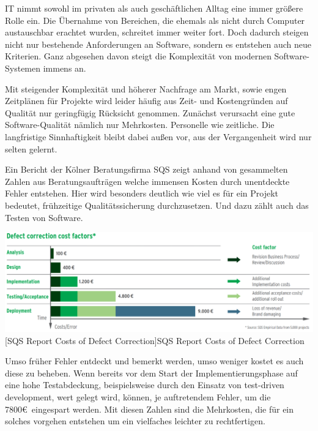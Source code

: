 \documentclass[12pt,a4paper,bibliography=totocnumbered,listof=totocnumbered]{scrartcl}
\begin{document}
IT nimmt sowohl im privaten als auch geschäftlichen Alltag eine immer größere Rolle ein. Die Übernahme von Bereichen, die ehemals als nicht durch Computer austauschbar erachtet wurden, schreitet immer weiter fort. Doch dadurch steigen nicht nur bestehende Anforderungen an Software, sondern es entstehen auch neue Kriterien. Ganz abgesehen davon steigt die Komplexität von modernen Software-Systemen immens an.

Mit steigender Komplexität und höherer Nachfrage am Markt, sowie engen Zeitplänen für Projekte wird leider häufig aus Zeit- und Kostengründen auf Qualität nur geringfügig Rücksicht genommen. Zunächst verursacht eine gute Software-Qualität nämlich nur Mehrkosten. Personelle wie zeitliche. Die langfristige Sinnhaftigkeit bleibt dabei außen vor, aus der Vergangenheit wird nur selten gelernt.

Ein Bericht der Kölner Beratungsfirma SQS zeigt anhand von gesammelten Zahlen aus Beratungsaufträgen welche immensen Kosten durch unentdeckte Fehler entstehen. Hier wird besonders deutlich wie viel es für ein Projekt bedeutet, frühzeitige Qualitätssicherung durchzusetzen. Und dazu zählt auch das Testen von Software.

\vspace{1em}
\begin{minipage}{\linewidth}
	\centering
	\includegraphics[width=0.9\linewidth]{images/img_sqs-defect-correction.PNG}
	[SQS Report Costs of Defect Correction]{SQS Report Costs of Defect Correction \cite{sqsdefect}}
	\label{fig:img_sqs-defect-correction}
\end{minipage}

Umso früher Fehler entdeckt und bemerkt werden, umso weniger kostet es auch diese zu beheben. Wenn bereits vor dem Start der Implementierungsphase auf eine hohe Testabdeckung, beispielsweise durch den Einsatz von test-driven development, wert gelegt wird, können, je auftretendem Fehler, um die 7800\euro\ eingespart werden. Mit diesen Zahlen sind die Mehrkosten, die für ein solches vorgehen entstehen um ein vielfaches leichter zu rechtfertigen.
\end{document}
